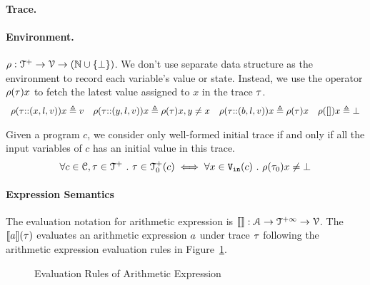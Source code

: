 \paragraph{Trace.}

%
\paragraph{Environment.} $\rho : {\mathcal{T}^{+}}  \to \mathcal{V} \to(\mathbb{N} \cup \{\bot\})$.  
We don't use separate data structure as the environment to record each variable's value or state. Instead, we use the operator $\rho (\mathtt{\tau}) x$ to fetch the latest value assigned to $x$ in the trace $\mathtt{\tau}$. 
\[
\begin{array}{llll}
\rho(\mathtt{\tau}  {\small ::} (x, l, v)) x \triangleq v
&
\rho(\mathtt{\tau} {\small ::} (y, l, v)) x \triangleq \rho(\mathtt{\tau}) x, y \neq x
&
\rho(\mathtt{\tau} {\small ::} (b, l, v)) x \triangleq \rho(\mathtt{\tau}) x
&
\rho({[]} ) x \triangleq \bot
\end{array}
\]
%
\begin{defn}
  \label{def:initial_trace}
  Given a program $c$, we consider only well-formed initial trace if and only if all the input variables of $c$ has an initial value in this trace.
  \[
    \forall c \in \mathcal{C}, \mathtt{\tau} \in \mathcal{T}^{+} ~.~ \mathtt{\tau} \in \mathcal{T}^{+}_0(c) \iff 
    \forall x \in {\ensuremath{\mathtt{V_{\mathtt{in}}}}}(c) ~.~ \rho(\mathtt{\tau}_0) x \neq \bot
    \]
\end{defn}
%
%
\paragraph{Expression Semantics}
The evaluation notation for arithmetic expression is $\llbracket  \rrbracket : \mathcal{A} \to \mathcal{T}^{+\infty} \to \mathcal{V}$.
The $\llbracket a \rrbracket(\mathtt{\tau})$ evaluates an arithmetic expression $a$ under trace $\mathtt{\tau}$ following the arithmetic expression evaluation rules in Figure~\ref{fig:aexpr-eval}.
\begin{figure}
   \caption{Evaluation Rules of Arithmetic Expression}
   \label{fig:aexpr-eval}
   \end{figure}

